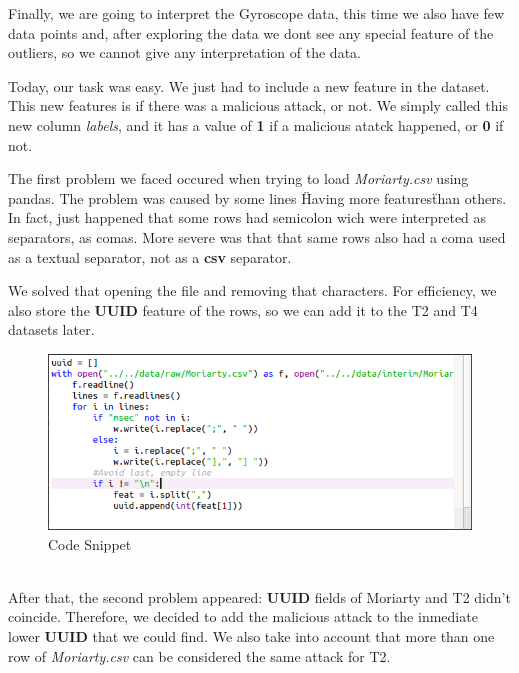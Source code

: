 \documentclass[idxtotoc,hyperref,openany]{labbook} %
\begin{document}
Finally, we are going to interpret the Gyroscope data, this time we also have few data points and, after exploring the data we dont see any special feature of the outliers, so we cannot give any interpretation of the data.



Today, our task was easy. We just had to include a new feature in the dataset. This new features is if there was a malicious attack, or not. We simply called this new column \textit{labels}, and it has a value of \textbf{1} if a malicious atatck happened, or \textbf{0} if not.

The first problem we faced occured when trying to load \textit{Moriarty.csv} using pandas. The problem was caused by some lines \"Having more features\" than others. In fact, just happened that some rows had semicolon wich were interpreted as separators, as comas. More severe was that that same rows also had a coma used as a textual separator, not as a \textbf{csv} separator.

We solved that opening the file and removing that characters. For efficiency, we also store the \textbf{UUID} feature of the rows, so we can add it to the T2 and T4 datasets later.

\begin{figure}[h]
\includegraphics[width=0.9\linewidth]{Milestone2/replace.png}
\setlength\belowcaptionskip{-10pt}
\caption{Code Snippet}
\label{Acceleration Factorplot 2}
\end{figure}

\textbf{  }\\
After that, the second problem appeared: \textbf{UUID} fields of Moriarty and T2 didn't coincide. Therefore, we decided to add the malicious attack to the inmediate lower \textbf{UUID} that we could find. We also take into account that more than one row of \textit{Moriarty.csv} can be considered the same attack for T2.
\end{document}
